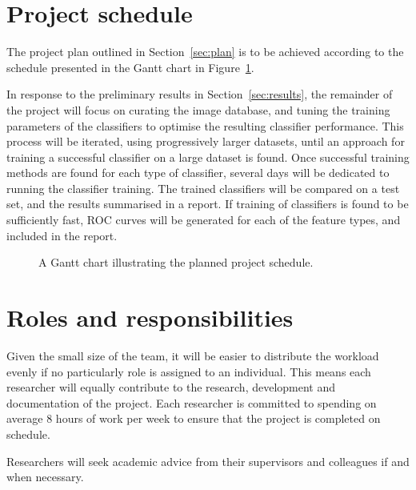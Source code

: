 \documentclass[11pt]{scrartcl}
\begin{document}
    \section{Project schedule} {
    \label{sec:schedule}

        The project plan outlined in Section~\ref{sec:plan} is to be achieved
        according to the schedule presented in the Gantt chart in
        Figure~\ref{gantt:proposal}.

        In response to the preliminary results in Section~\ref{sec:results}, the
        remainder of the project will focus on curating the image database,
        and tuning the training parameters of the classifiers to optimise the
        resulting classifier performance. This process will be iterated, using
        progressively larger datasets, until an approach for training a
        successful classifier on a large dataset is found. Once successful
        training methods are found for each type of classifier, several days
        will be dedicated to running the classifier training. The trained
        classifiers will be compared on a test set, and the results summarised
        in a report. If training of classifiers is found to be sufficiently
        fast, ROC curves will be generated for each of the feature types, and
        included in the report.

        \begin{figure}[H]
            \makebox[\textwidth][c]{\resizebox{0.95\paperwidth}{!}{}}
            \caption[Project Schedule] {
                A Gantt chart illustrating the planned project schedule.
            }
            \label{gantt:proposal}
        \end{figure}
    }

    \section{Roles and responsibilities} {

        Given the small size of the team, it will be easier to distribute the workload evenly if no particularly role is assigned to an individual. This means each researcher will equally contribute to the research, development and documentation of the project. Each researcher is committed to spending on average 8 hours of work per week to ensure that the project is completed on schedule.

        Researchers will seek academic advice from their supervisors and colleagues if and when necessary.
    }
\end{document}
